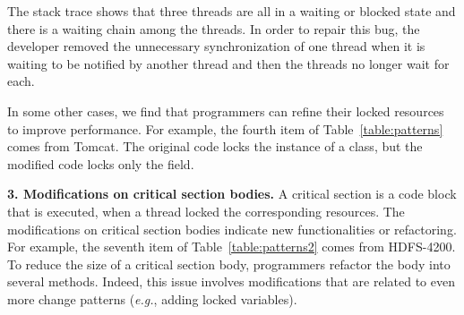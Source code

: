 The stack trace shows that three threads are all in a waiting or blocked state and there is a waiting chain among the threads. In order to repair this bug, the developer removed the unnecessary synchronization of one thread when it is waiting to be notified by another thread and then the threads no longer wait for each.



In some other cases, we find that programmers can refine their locked resources to improve performance. For example, the fourth item of Table~\ref{table:patterns} comes from Tomcat. The original code locks the instance of a class, but the modified code locks only the  field.

\noindent
\textbf{3. Modifications on critical section bodies.} A critical section is a code block that is executed, when a thread locked the corresponding resources. The modifications on critical section bodies indicate new functionalities or refactoring. For example, the seventh item of Table~\ref{table:patterns2} comes from HDFS-4200. To reduce the size of a critical section body, programmers refactor the body into several methods. Indeed, this issue involves modifications that are related to even more change patterns (\emph{e.g.}, adding locked variables).


